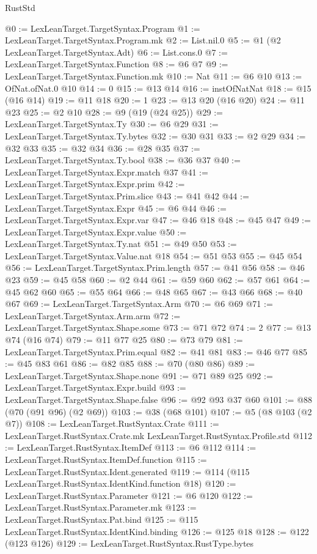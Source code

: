 \begin{lexlean}{RustStd}
\begin{coremodule}
{\begin{coremodule}
{{{{{@0 := LexLeanTarget.TargetSyntax.Program
@1 := LexLeanTarget.TargetSyntax.Program.mk
@2 := List.nil.{0}
@5 := @1 (@2 LexLeanTarget.TargetSyntax.Adt)
@6 := List.cons.{0}
@7 := LexLeanTarget.TargetSyntax.Function
@8 := @6 @7
@9 := LexLeanTarget.TargetSyntax.Function.mk
@10 := Nat
@11 := @6 @10
@13 := OfNat.ofNat.{0} @10
@14 := 0
@15 := @13 @14
@16 := instOfNatNat
@18 := @15 (@16 @14)
@19 := @11 @18
@20 := 1
@23 := @13 @20 (@16 @20)
@24 := @11 @23
@25 := @2 @10
@28 := @9 (@19 (@24 @25))
@29 := LexLeanTarget.TargetSyntax.Ty
@30 := @6 @29
@31 := LexLeanTarget.TargetSyntax.Ty.bytes
@32 := @30 @31
@33 := @2 @29
@34 := @32 @33
@35 := @32 @34
@36 := @28 @35
@37 := LexLeanTarget.TargetSyntax.Ty.bool
@38 := @36 @37
@40 := LexLeanTarget.TargetSyntax.Expr.match @37
@41 := LexLeanTarget.TargetSyntax.Expr.prim
@42 := LexLeanTarget.TargetSyntax.Prim.slice
@43 := @41 @42
@44 := LexLeanTarget.TargetSyntax.Expr
@45 := @6 @44
@46 := LexLeanTarget.TargetSyntax.Expr.var
@47 := @46 @18
@48 := @45 @47
@49 := LexLeanTarget.TargetSyntax.Expr.value
@50 := LexLeanTarget.TargetSyntax.Ty.nat
@51 := @49 @50
@53 := LexLeanTarget.TargetSyntax.Value.nat @18
@54 := @51 @53
@55 := @45 @54
@56 := LexLeanTarget.TargetSyntax.Prim.length
@57 := @41 @56
@58 := @46 @23
@59 := @45 @58
@60 := @2 @44
@61 := @59 @60
@62 := @57 @61
@64 := @45 @62 @60
@65 := @55 @64
@66 := @48 @65
@67 := @43 @66
@68 := @40 @67
@69 := LexLeanTarget.TargetSyntax.Arm
@70 := @6 @69
@71 := LexLeanTarget.TargetSyntax.Arm.arm
@72 := LexLeanTarget.TargetSyntax.Shape.some
@73 := @71 @72
@74 := 2
@77 := @13 @74 (@16 @74)
@79 := @11 @77 @25
@80 := @73 @79
@81 := LexLeanTarget.TargetSyntax.Prim.equal
@82 := @41 @81
@83 := @46 @77
@85 := @45 @83 @61
@86 := @82 @85
@88 := @70 (@80 @86)
@89 := LexLeanTarget.TargetSyntax.Shape.none
@91 := @71 @89 @25
@92 := LexLeanTarget.TargetSyntax.Expr.build
@93 := LexLeanTarget.TargetSyntax.Shape.false
@96 := @92 @93 @37 @60
@101 := @88 (@70 (@91 @96) (@2 @69))
@103 := @38 (@68 @101)
@107 := @5 (@8 @103 (@2 @7))
@108 := LexLeanTarget.RustSyntax.Crate
@111 := LexLeanTarget.RustSyntax.Crate.mk LexLeanTarget.RustSyntax.Profile.std
@112 := LexLeanTarget.RustSyntax.ItemDef
@113 := @6 @112
@114 := LexLeanTarget.RustSyntax.ItemDef.function
@115 := LexLeanTarget.RustSyntax.Ident.generated
@119 := @114 (@115 LexLeanTarget.RustSyntax.IdentKind.function @18)
@120 := LexLeanTarget.RustSyntax.Parameter
@121 := @6 @120
@122 := LexLeanTarget.RustSyntax.Parameter.mk
@123 := LexLeanTarget.RustSyntax.Pat.bind
@125 := @115 LexLeanTarget.RustSyntax.IdentKind.binding
@126 := @125 @18
@128 := @122 (@123 @126)
@129 := LexLeanTarget.RustSyntax.RustType.bytes
}}}}}
\end{coremodule}}
\end{coremodule}
\end{lexlean}
